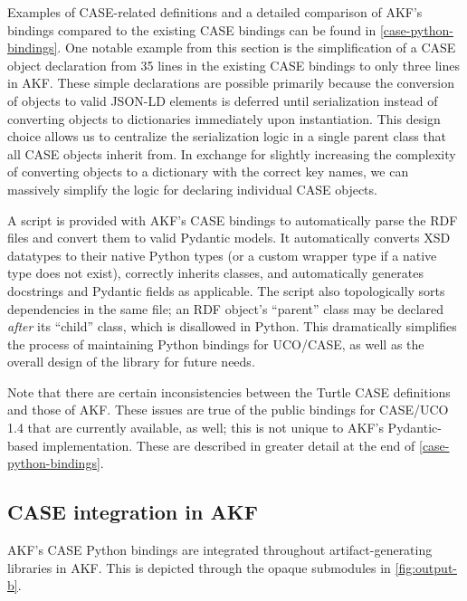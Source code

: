 \documentclass[letterpaper,12pt]{report}
\begin{document}
Examples of CASE-related definitions and a detailed comparison of AKF's
bindings compared to the existing CASE bindings can be found in
\autoref{case-python-bindings}. One notable example
from this section is the simplification of a CASE object declaration
from 35 lines in the existing CASE bindings to only three lines in AKF.
These simple declarations are possible primarily because the conversion
of objects to valid JSON-LD elements is deferred until serialization
instead of converting objects to dictionaries immediately upon
instantiation. This design choice allows us to centralize the
serialization logic in a single parent class that all CASE objects
inherit from. In exchange for slightly increasing the complexity of
converting objects to a dictionary with the correct key names, we can
massively simplify the logic for declaring individual CASE objects.

A script is provided with AKF's CASE bindings to automatically parse the
RDF files and convert them to valid Pydantic models. It automatically
converts XSD datatypes to their native Python types (or a custom wrapper
type if a native type does not exist), correctly inherits classes, and
automatically generates docstrings and Pydantic fields as applicable.
The script also topologically sorts dependencies in the same file; an
RDF object's ``parent'' class may be declared \emph{after} its ``child''
class, which is disallowed in Python. This dramatically simplifies the
process of maintaining Python bindings for UCO/CASE, as well as the
overall design of the library for future needs.

Note that there are certain inconsistencies between the Turtle CASE
definitions and those of AKF. These issues are true of the public
bindings for CASE/UCO 1.4 that are currently available, as well; this is
not unique to AKF's Pydantic-based implementation. These are described
in greater detail at the end of \autoref{case-python-bindings}.

\subsection{CASE integration in
AKF}\label{case-integration-in-akf}

AKF's CASE Python bindings are integrated throughout artifact-generating
libraries in AKF. This is depicted through the opaque submodules in
\autoref{fig:output-b}.
\end{document}
